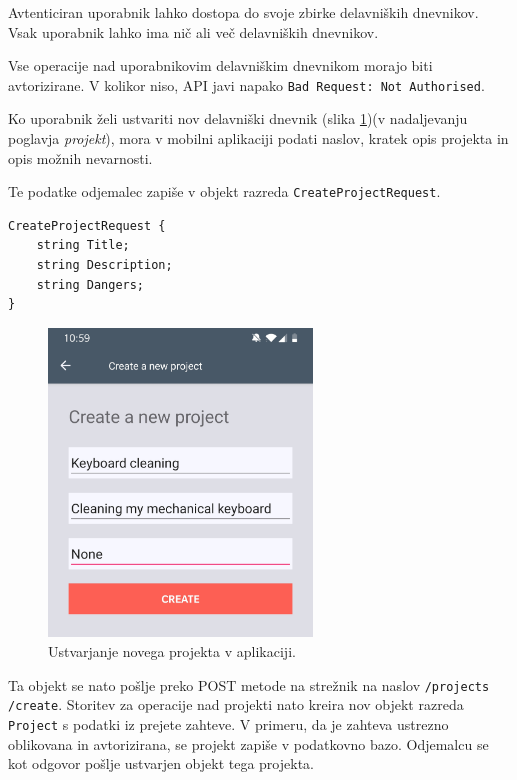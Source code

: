 \documentclass[a4paper, 12pt]{book}
\begin{document}
Avtenticiran uporabnik lahko dostopa do svoje zbirke delavniških dnevnikov.
Vsak uporabnik lahko ima nič ali več delavniških dnevnikov.

Vse operacije nad uporabnikovim delavniškim dnevnikom morajo biti avtorizirane.
V kolikor niso, API javi napako \texttt{Bad Request: Not Authorised}.

Ko uporabnik želi ustvariti nov delavniški dnevnik (slika \ref{app_create_new})(v nadaljevanju poglavja \textit{projekt}), mora v mobilni aplikaciji podati naslov, kratek opis projekta in opis možnih nevarnosti.

Te podatke odjemalec zapiše v objekt razreda \texttt{CreateProjectRequest}.

\begin{verbatim}
CreateProjectRequest { 
    string Title;  
    string Description; 
    string Dangers; 
} 
\end{verbatim}

\begin{figure}[H]
\begin{center}
\includegraphics[width=7cm]{app_create_new_small}
\end{center}
	\caption{Ustvarjanje novega projekta v aplikaciji.}
\label{app_create_new}
\end{figure}

\noindent Ta objekt se nato pošlje preko POST metode na strežnik na naslov \texttt{/projects\\/create}.
Storitev za operacije nad projekti nato kreira nov objekt razreda \texttt{Project} s podatki iz prejete zahteve.
V primeru, da je zahteva ustrezno oblikovana in avtorizirana, se projekt zapiše v podatkovno bazo.
Odjemalcu se kot odgovor pošlje ustvarjen objekt tega projekta.
\end{document}
